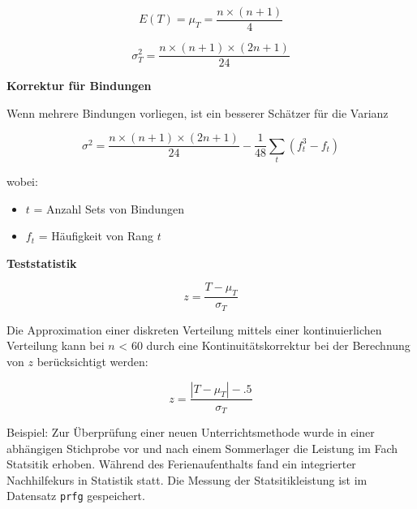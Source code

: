 \documentclass[
]{book}
\providecommand{\tightlist}{%
  \setlength{\itemsep}{0pt}\setlength{\parskip}{0pt}}
\begin{document}
\begin{equation}
  E(T) = \mu_T = \frac{n \times (n + 1)}{4}
  \label{eq:mu-wilcox}
\end{equation}

\begin{equation}
  \sigma_T^2 = \frac{n \times (n + 1) \times (2n + 1)}{24}
  \label{eq:var-wilcox}
\end{equation}

\textbf{Korrektur für Bindungen}

Wenn mehrere Bindungen vorliegen, ist ein besserer Schätzer für die Varianz

\begin{equation}
  \sigma^2 = \frac{n \times (n + 1) \times (2n + 1)}{24} - \frac{1}{48} \sum_t(f_t^3 - f_t)
  \label{eq:var-corr}
\end{equation}

wobei:

\begin{itemize}
\tightlist
\item
  \(t\) = Anzahl Sets von Bindungen\\
\item
  \(f_t\) = Häufigkeit von Rang \(t\)
\end{itemize}

\textbf{Teststatistik}

\begin{equation}
  z = \frac{T - \mu_T}{\sigma_T}
  \label{eq:z-wilcox}
\end{equation}

Die Approximation einer diskreten Verteilung mittels einer kontinuierlichen Verteilung kann bei \(n\) \textless{} 60 durch eine Kontinuitätskorrektur bei der Berechnung von \(z\) berücksichtigt werden:

\begin{equation}
  z = \frac{|T - \mu_T|-.5}{\sigma_T}
  \label{eq:z-wilcox-contcorr}
\end{equation}

Beispiel: Zur Überprüfung einer neuen Unterrichtsmethode wurde in einer abhängigen Stichprobe vor und nach einem Sommerlager die Leistung im Fach Statsitik erhoben. Während des Ferienaufenthalts fand ein integrierter Nachhilfekurs in Statistik statt. Die Messung der Statsitikleistung ist im Datensatz \texttt{prfg} gespeichert.
\end{document}
